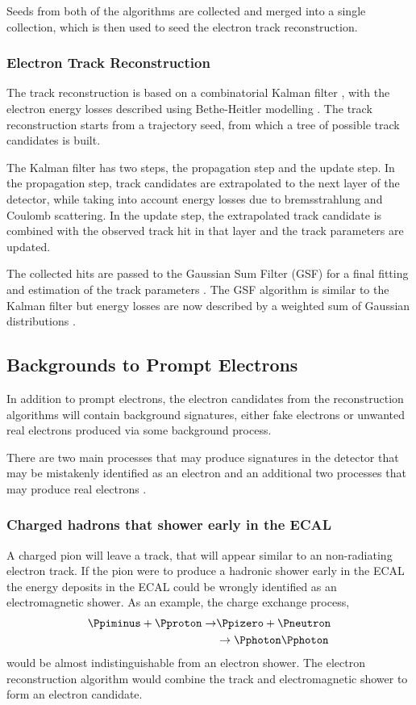 Seeds from both of the algorithms are collected and merged into a single
collection, which is then used to seed the electron track reconstruction.

\subsubsection{Electron Track Reconstruction}
The track reconstruction is based on a combinatorial Kalman filter \cite{kalman},
with the electron energy losses described using Bethe-Heitler
modelling \cite{bethe}.
The track reconstruction starts from a trajectory seed, from which a tree of
possible track candidates is built. 

The Kalman filter has two steps, the propagation step and the update step. In
the propagation step, track candidates are extrapolated to the next layer of the
detector, while taking into account energy losses due to bremsstrahlung and
Coulomb scattering.  In the update step, the extrapolated track candidate is
combined with the observed track hit in that layer and the track parameters are
updated. 

The collected hits are passed to the Gaussian Sum Filter (GSF) for a final
fitting and estimation of the track parameters \cite{cmsgsf}. The {GSF}
algorithm is similar to the Kalman filter but energy losses are now described by
a weighted sum of Gaussian distributions \cite{gsf}.

\subsection{Backgrounds to Prompt Electrons}
In addition to prompt electrons, the electron candidates from the reconstruction
algorithms will contain background signatures, either fake electrons or unwanted
real electrons produced via some background process.

There are two main processes that may produce signatures in the detector that
may be mistakenly identified as an electron and an additional
two processes that may produce real electrons \cite{nikos}.

\subsubsection{Charged hadrons that shower early in the ECAL}
A charged pion will leave a track, that will appear similar to an non-radiating
electron track.
If the pion were to produce a hadronic shower early in the ECAL
the energy deposits in the ECAL could be wrongly identified as an
electromagnetic shower.
As an example, the charge exchange process,
\begin{align}
\Ppiminus + \Pproton \to &\Ppizero + \Pneutron \nonumber \\
                         &\to \Pphoton\Pphoton
\end{align}
would be almost indistinguishable from an electron shower.
The electron reconstruction algorithm would combine the
track and electromagnetic shower to form an electron candidate\cite{nikos}.

